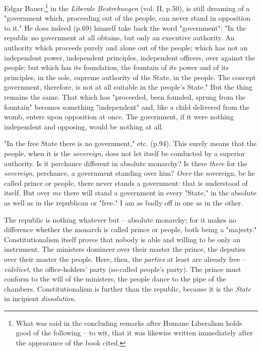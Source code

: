 \documentclass[a4paper]{book}
\begin{document}
Edgar Bauer,\footnote{What was said in the concluding remarks after Humane 
Liberalism holds good of the following -- to wit, that it was likewise written 
immediately after the appearance of the book cited.} in the \textit{Liberale 
Bestrebungen} (vol. II, p.50), is still dreaming of a "{}government which, 
proceeding out of the people, can never stand in opposition to it."{} He does 
indeed (p.69) himself take back the word "{}government"{}: "{}In the republic 
no government at all obtains, but only an executive authority. An authority 
which proceeds purely and alone out of the people; which has not an 
independent power, independent principles, independent officers, over against 
the people; but which has its foundation, the fountain of its power and of its 
principles, in the sole, supreme authority of the State, in the people. The 
concept government, therefore, is not at all suitable in the people's 
State."{} But the thing remains the same. That which has "{}proceeded, been 
founded, sprung from the fountain"{} becomes something "{}independent"{} and, 
like a child delivered from the womb, enters upon opposition at once. The 
government, if it were nothing independent and opposing, would be nothing at 
all.

"{}In the free State there is no government,"{} etc. (p.94). This surely means 
that the people, when it is the \textit{sovereign}, does not let itself be 
conducted by a superior authority. Is it perchance different in absolute 
monarchy? Is there \textit{there} for the \textit{sovereign}, perchance, a 
government standing over him? \textit{Over} the sovereign, be he called prince 
or people, there never stands a government: that is understood of itself. But 
over \textit{me} there will stand a government in every "{}State,"{} in the 
absolute as well as in the republican or "{}free."{} I am as badly off in one 
as in the other.

The republic is nothing whatever but -- absolute monarchy; for it makes no 
difference whether the monarch is called prince or people, both being a 
"{}majesty."{} Constitutionalism itself proves that nobody is able and willing 
to be only an instrument. The ministers domineer over their master the prince, 
the deputies over their master the people. Here, then, the \textit{parties} at 
least are already free -- \textit{videlicet}, the office-holders' party 
(so-called people's party). The prince must conform to the will of the 
ministers, the people dance to the pipe of the chambers. Constitutionalism is 
further than the republic, because it is the \textit{State} in incipient 
\textit{dissolution}.
\end{document}
